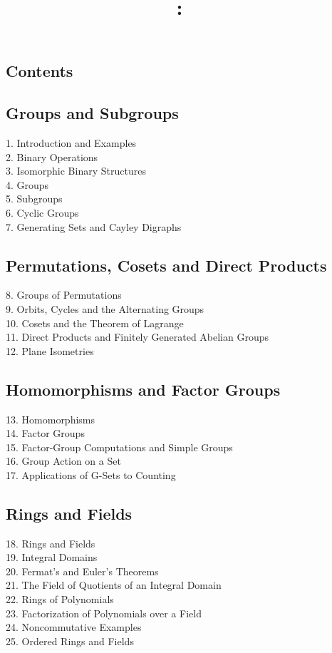 \documentclass{article}
\title{\vspace{2in}\textmd{\textbf{\hmwkClass:\ \hmwkTitle}}\\\normalsize\vspace{0.1in}\vspace{0.1in}\large{\textit{\hmwkClassInstructor}}\vspace{3in}}
\date{}
\author{\textbf{\hmwkAuthorName}}
\begin{document}
\begin{spacing}{1.1}
\newpage


\section{Contents}
\subsection{Groups and Subgroups}
1. Introduction and Examples
\\ 2. Binary Operations
\\ 3. Isomorphic Binary Structures
\\ 4. Groups
\\ 5. Subgroups
\\ 6. Cyclic Groups
\\ 7. Generating Sets and Cayley Digraphs

\subsection{Permutations, Cosets and Direct Products}
8. Groups of Permutations
\\ 9. Orbits, Cycles and the Alternating Groups
\\ 10. Cosets and the Theorem of Lagrange
\\ 11. Direct Products and Finitely Generated Abelian Groups
\\ 12. Plane Isometries

\subsection{Homomorphisms and Factor Groups}
13. Homomorphisms
\\ 14. Factor Groups
\\ 15. Factor-Group Computations and Simple Groups
\\ 16. Group Action on a Set
\\ 17. Applications of G-Sets to Counting

\subsection{Rings and Fields}
18. Rings and Fields
\\ 19. Integral Domains
\\ 20. Fermat's and Euler's Theorems
\\ 21. The Field of Quotients of an Integral Domain
\\ 22. Rings of Polynomials
\\ 23. Factorization of Polynomials over a Field
\\ 24. Noncommutative Examples
\\ 25. Ordered Rings and Fields


\end{spacing}
\end{document}
